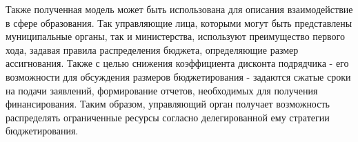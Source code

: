 Также полученная модель может быть использована для описания взаимодействие в сфере образования. Так управляющие лица, которыми могут быть представлены муниципальные органы, так и министерства, используют преимущество первого хода, задавая правила распределения бюджета, определяющие размер ассигнования. Также с целью снижения коэффициента дисконта подрядчика - его возможности для обсуждения размеров бюджетирования - задаются сжатые сроки на подачи заявлений, формирование отчетов, необходимых для получения финансирования. Таким образом, управляющий орган получает возможность распределять ограниченные ресурсы согласно делегированной ему стратегии бюджетирования.  


